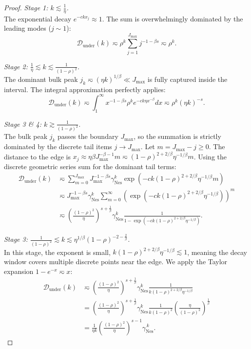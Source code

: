 \begin{proof}
\textit{Stage 1: $k \lesssim \frac{1}{\eta}$.} \\
The exponential decay $e^{-ckx_j} \approx 1$. The sum is overwhelmingly dominated by the leading modes ($j \sim 1$):
\[
    \mathcal{D}_{\mathrm{under}}(k) \eqsim \rho^k \sum_{j=1}^{J_{\max}} j^{-1-\beta s} \eqsim \rho^k.
\]

\textit{Stage 2: $\frac{1}{\eta} \lesssim k \lesssim \frac{1}{(1-\rho)^2}$.} \\
The dominant bulk peak $j_k \eqsim (\eta k)^{1/\beta} \ll J_{\max}$ is fully captured inside the interval. The integral approximation perfectly applies:
\[
    \mathcal{D}_{\mathrm{under}}(k) \eqsim \int_1^{\infty} x^{-1-\beta s} \rho^k e^{-c k \eta x^{-\beta}} dx \eqsim \rho^k (\eta k)^{-s}.
\]

\textit{Stage 3 \& 4: $k \gtrsim \frac{1}{(1-\rho)^2}$.} \\
The bulk peak $j_k$ passes the boundary $J_{\max}$, so the summation is strictly dominated by the discrete tail items $j \to J_{\max}$. Let $m = J_{\max} - j \ge 0$. The distance to the edge is $x_j \approx \eta\beta J_{\max}^{-\beta-1} m \eqsim (1-\rho)^{2+2/\beta}\eta^{-1/\beta} m$. 
Using the discrete geometric series sum for the dominant tail terms:
\begin{align*}
    \mathcal{D}_{\mathrm{under}}(k) 
    &\eqsim \sum_{m=0}^{J_{\max}} J_{\max}^{-1-\beta s} \gamma_{\mathrm{Nes}}^k \exp\left(-c k (1-\rho)^{2+2/\beta}\eta^{-1/\beta} m\right) \\
    &\eqsim J_{\max}^{-1-\beta s} \gamma_{\mathrm{Nes}}^k \sum_{m=0}^{\infty} \left( \exp\left(-c k (1-\rho)^{2+2/\beta}\eta^{-1/\beta}\right) \right)^m \\
    &\eqsim \left(\frac{(1-\rho)^2}{\eta}\right)^{s+\frac{1}{\beta}} \gamma_{\mathrm{Nes}}^k \frac{1}{1 - \exp\left(-c k (1-\rho)^{2+2/\beta}\eta^{-1/\beta}\right)}.
\end{align*}

\textit{Stage 3: $\frac{1}{(1-\rho)^2} \lesssim k \lesssim \eta^{1/\beta}(1-\rho)^{-2-\frac{2}{\beta}}$.} \\
In this stage, the exponent is small, $k (1-\rho)^{2+2/\beta}\eta^{-1/\beta} \lesssim 1$, meaning the decay window covers multiple discrete points near the edge. We apply the Taylor expansion $1 - e^{-x} \eqsim x$:
\begin{align*}
    \mathcal{D}_{\mathrm{under}}(k) 
    &\eqsim \left(\frac{(1-\rho)^2}{\eta}\right)^{s+\frac{1}{\beta}} \gamma_{\mathrm{Nes}}^k \frac{1}{k (1-\rho)^{2+2/\beta}\eta^{-1/\beta}} \\
    &= \left(\frac{(1-\rho)^2}{\eta}\right)^{s+\frac{1}{\beta}} \gamma_{\mathrm{Nes}}^k \frac{1}{k(1-\rho)^2} \left(\frac{\eta}{(1-\rho)^2}\right)^{\frac{1}{\beta}} \\
    &= \frac{1}{\eta k}\left(\frac{(1-\rho)^2}{\eta}\right)^{s-1}\gamma_{\mathrm{Nes}}^{\,k}.
\end{align*}


\end{proof}
